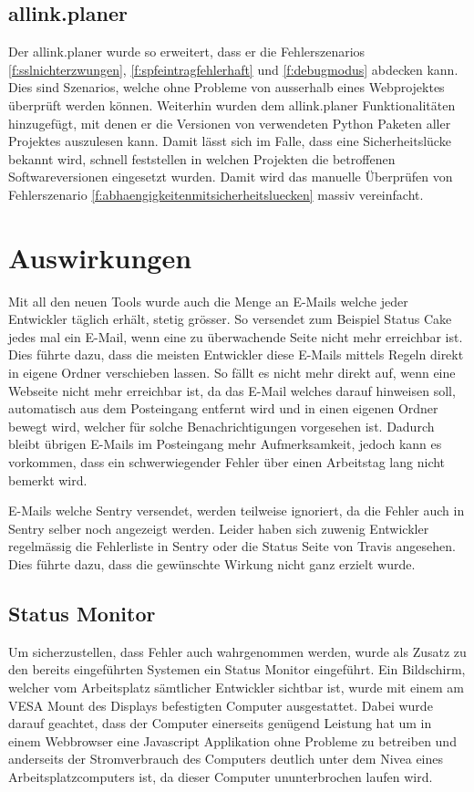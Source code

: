 \subsection{allink.planer}
\label{sub:proof_allink_planer}
Der allink.planer wurde so erweitert, dass er die Fehlerszenarios \ref{f:sslnichterzwungen}, \ref{f:spfeintragfehlerhaft} und \ref{f:debugmodus} abdecken kann. Dies sind Szenarios, welche ohne Probleme von ausserhalb eines Webprojektes überprüft werden können. Weiterhin wurden dem allink.planer Funktionalitäten hinzugefügt, mit denen er die Versionen von verwendeten Python Paketen aller Projektes auszulesen kann. Damit lässt sich im Falle, dass eine Sicherheitslücke bekannt wird, schnell feststellen in welchen Projekten die betroffenen Softwareversionen eingesetzt wurden. Damit wird das manuelle Überprüfen von Fehlerszenario \ref{f:abhaengigkeitenmitsicherheitsluecken} massiv vereinfacht.

\section{Auswirkungen}
\label{sec:auswirkungen}
Mit all den neuen Tools wurde auch die Menge an E-Mails welche jeder Entwickler täglich erhält, stetig grösser. So versendet zum Beispiel Status Cake jedes mal ein E-Mail, wenn eine zu überwachende Seite nicht mehr erreichbar ist. Dies führte dazu, dass die meisten Entwickler diese E-Mails mittels Regeln direkt in eigene Ordner verschieben lassen. So fällt es nicht mehr direkt auf, wenn eine Webseite nicht mehr erreichbar ist, da das E-Mail welches darauf hinweisen soll, automatisch aus dem Posteingang entfernt wird und in einen eigenen Ordner bewegt wird, welcher für solche Benachrichtigungen vorgesehen ist. Dadurch bleibt übrigen E-Mails im Posteingang mehr Aufmerksamkeit, jedoch kann es vorkommen, dass ein schwerwiegender Fehler über einen Arbeitstag lang nicht bemerkt wird.

E-Mails welche Sentry versendet, werden teilweise ignoriert, da die Fehler auch in Sentry selber noch angezeigt werden. Leider haben sich zuwenig Entwickler regelmässig die Fehlerliste in Sentry oder die Status Seite von Travis angesehen. Dies führte dazu, dass die gewünschte Wirkung nicht ganz erzielt wurde.

\subsection{Status Monitor}
\label{sub:status_monitor}
Um sicherzustellen, dass Fehler auch wahrgenommen werden, wurde als Zusatz zu den bereits eingeführten Systemen ein Status Monitor eingeführt. Ein Bildschirm, welcher vom Arbeitsplatz sämtlicher Entwickler sichtbar ist, wurde mit einem am VESA Mount des Displays befestigten Computer ausgestattet. Dabei wurde darauf geachtet, dass der Computer einerseits genügend Leistung hat um in einem Webbrowser eine Javascript Applikation ohne Probleme zu betreiben und anderseits der Stromverbrauch des Computers deutlich unter dem Nivea eines Arbeitsplatzcomputers ist, da dieser Computer ununterbrochen laufen wird.

